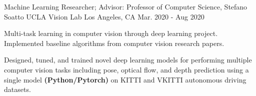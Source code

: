 \cventry
    {Machine Learning Researcher; Advisor: Professor of Computer Science, Stefano Soatto} %
    {UCLA Vision Lab} %
    {Los Angeles, CA} %
    {Mar. 2020 - Aug 2020} %
    {
      \begin{cvitems} %
        \item {Multi-task learning in computer vision through deep learning project. 
            Implemented baseline algorithms from computer vision research papers. 
        }
        \item {  
        Designed, tuned, and trained novel deep learning models for performing 
        multiple computer vision tasks including pose, optical flow, and depth prediction
        using a single model \textbf{(Python/Pytorch)} on KITTI and VKITTI autonomous driving 
        datasets.
        }
      \end{cvitems}
    } 